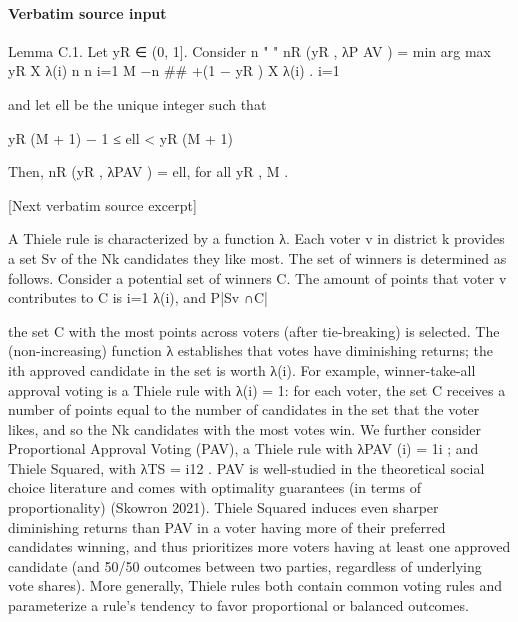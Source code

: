 \documentclass[10pt]{article}
\begin{document}
\paragraph{Verbatim source input}
\begin{ReviewVerbatim}
Lemma C.1. Let yR ∈ (0, 1]. Consider
                                                                          n
                                                       "           "
                              nR (yR , λP AV ) = min arg max yR
                                                                          X
                                                                                λ(i)
                                                  n         n
                                                                          i=1
                                                                   M −n
                                                                                 ##
                                                      +(1 − yR )
                                                                   X
                                                                          λ(i)        .
                                                                   i=1

    and let ell be the unique integer such that

                                    yR (M + 1) − 1 ≤ ell < yR (M + 1)

    Then, nR (yR , λPAV ) = ell, for all yR , M .

[Next verbatim source excerpt]

    A Thiele rule is characterized by a function λ. Each voter v in district k provides a set Sv
of the Nk candidates they like most. The set of winners is determined as follows. Consider a
potential set of winners C. The amount of points that voter v contributes to C is i=1         λ(i), and
                                                                                     P|Sv ∩C|

the set C with the most points across voters (after tie-breaking) is selected. The (non-increasing)
function λ establishes that votes have diminishing returns; the ith approved candidate in the set is
worth λ(i). For example, winner-take-all approval voting is a Thiele rule with λ(i) = 1: for each
voter, the set C receives a number of points equal to the number of candidates in the set that the
voter likes, and so the Nk candidates with the most votes win. We further consider Proportional
Approval Voting (PAV), a Thiele rule with λPAV (i) = 1i ; and Thiele Squared, with λTS = i12 . PAV
is well-studied in the theoretical social choice literature and comes with optimality guarantees (in
terms of proportionality) (Skowron 2021). Thiele Squared induces even sharper diminishing returns
than PAV in a voter having more of their preferred candidates winning, and thus prioritizes more
voters having at least one approved candidate (and 50/50 outcomes between two parties, regardless
of underlying vote shares). More generally, Thiele rules both contain common voting rules and
parameterize a rule’s tendency to favor proportional or balanced outcomes.
\end{ReviewVerbatim}
\end{document}
